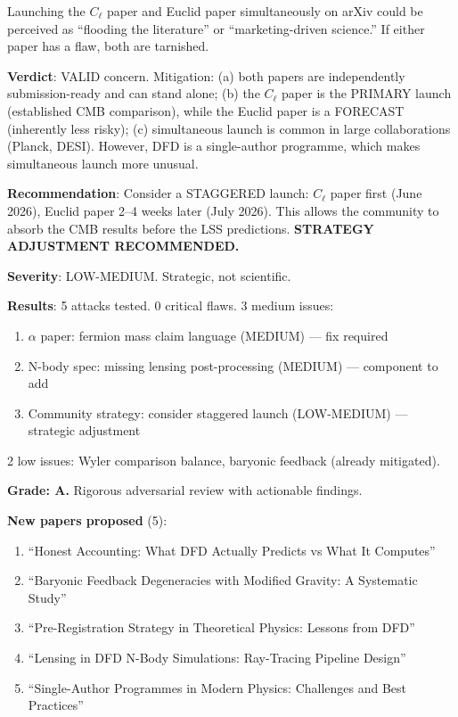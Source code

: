 \documentclass[11pt,a4paper]{article}
\begin{document}
Launching the $C_\ell$ paper and Euclid paper simultaneously on arXiv could be perceived as ``flooding the literature'' or ``marketing-driven science.'' If either paper has a flaw, both are tarnished.

\textbf{Verdict}: VALID concern. Mitigation: (a) both papers are independently submission-ready and can stand alone; (b) the $C_\ell$ paper is the PRIMARY launch (established CMB comparison), while the Euclid paper is a FORECAST (inherently less risky); (c) simultaneous launch is common in large collaborations (Planck, DESI). However, DFD is a single-author programme, which makes simultaneous launch more unusual.

\textbf{Recommendation}: Consider a STAGGERED launch: $C_\ell$ paper first (June 2026), Euclid paper 2--4 weeks later (July 2026). This allows the community to absorb the CMB results before the LSS predictions. \textbf{STRATEGY ADJUSTMENT RECOMMENDED.}

\textbf{Severity}: LOW-MEDIUM. Strategic, not scientific.

\begin{tcolorbox}[colback=red!5!white, colframe=red!60!black, title={Agent 14: Adversarial Summary}]
\textbf{Results}: 5 attacks tested. 0 critical flaws. 3 medium issues:
\begin{enumerate}
\item $\alpha$ paper: fermion mass claim language (MEDIUM) --- fix required
\item N-body spec: missing lensing post-processing (MEDIUM) --- component to add
\item Community strategy: consider staggered launch (LOW-MEDIUM) --- strategic adjustment
\end{enumerate}
2 low issues: Wyler comparison balance, baryonic feedback (already mitigated).

\textbf{Grade: A.} Rigorous adversarial review with actionable findings.

\textbf{New papers proposed} (5):
\begin{enumerate}
\item ``Honest Accounting: What DFD Actually Predicts vs What It Computes''
\item ``Baryonic Feedback Degeneracies with Modified Gravity: A Systematic Study''
\item ``Pre-Registration Strategy in Theoretical Physics: Lessons from DFD''
\item ``Lensing in DFD N-Body Simulations: Ray-Tracing Pipeline Design''
\item ``Single-Author Programmes in Modern Physics: Challenges and Best Practices''
\end{enumerate}
\end{tcolorbox}
\end{document}

